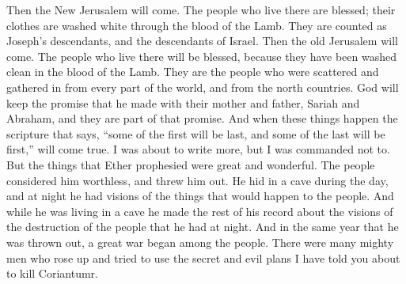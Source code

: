 Then the New Jerusalem will come. The people who live there are blessed; their clothes are washed white through the blood of the Lamb. They are counted as Joseph's descendants, and the descendants of Israel.
\bverse \iffalse And then also cometh the Jerusalem of old; and the inhabitants thereof, blessed are they, for they have been washed in the blood of the Lamb; and they are they who were scattered and gathered in from the four quarters of the earth, and from the north countries, and are partakers of the fulfilling of the covenant which God made with their father, Abraham. \fi
Then the old Jerusalem will come. The people who live there will be blessed, because they have been washed clean in the blood of the Lamb. They are the people who were scattered and gathered in from every part of the world, and from the north countries. God will keep the promise that he made with their mother and father, Sariah and Abraham, and they are part of that promise.
\bverse \iffalse And when these things come, bringeth to pass the scripture which saith, there are they who were first, who shall be last; and there are they who were last, who shall be first. \fi
And when these things happen the scripture that says, ``some of the first will be last, and some of the last will be first,'' will come true.
\bverse \iffalse And I was about to write more, but I am forbidden; but great and marvelous were the prophecies of Ether; but they esteemed him as naught, and cast him out; and he hid himself in the cavity of a rock by day, and by night he went forth viewing the things which should come upon the people. \fi
I was about to write more, but I was commanded not to. But the things that Ether prophesied were great and wonderful. The people considered him worthless, and threw him out. He hid in a cave during the day, and at night he had visions of the things that would happen to the people.
\bverse \iffalse And as he dwelt in the cavity of a rock he made the remainder of his record, viewing the destructions which came upon the people, by night. \fi
And while he was living in a cave he made the rest of his record about the visions of the destruction of the people that he had at night.
\bverse \iffalse And it came to pass that in that same year in which he was cast out from among the people there began to be a great war among the people, for there were many who rose up, who were mighty men, and sought to destroy Coriantumr by their secret plans of wickedness, of which hath been spoken. \fi
And in the same year that he was thrown out, a great war began among the people. There were many mighty men who rose up and tried to use the secret and evil plans I have told you about to kill Coriantumr.
